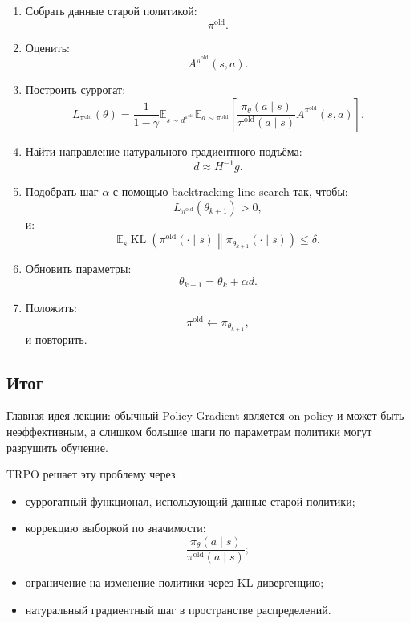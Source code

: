 \documentclass[12pt,a4paper]{article}
\begin{document}
\begin{enumerate}
    \item Собрать данные старой политикой:
    \[
    \pi^{\mathrm{old}}.
    \]

    \item Оценить:
    \[
    A^{\pi^{\mathrm{old}}}(s,a).
    \]

    \item Построить суррогат:
    \[
    L_{\pi^{\mathrm{old}}}(\theta)
    =
    \frac{1}{1-\gamma}
    \mathbb E_{s\sim d^{\pi^{\mathrm{old}}}}
    \mathbb E_{a\sim\pi^{\mathrm{old}}}
    \left[
    \frac{
    \pi_\theta(a\mid s)
    }{
    \pi^{\mathrm{old}}(a\mid s)
    }
    A^{\pi^{\mathrm{old}}}(s,a)
    \right].
    \]

    \item Найти направление натурального градиентного подъёма:
    \[
    d
    \approx
    H^{-1}g.
    \]

    \item Подобрать шаг $\alpha$ с помощью backtracking line search так, чтобы:
    \[
    L_{\pi^{\mathrm{old}}}(\theta_{k+1})>0,
    \]
    и:
    \[
    \mathbb E_s
    \operatorname{KL}
    \left(
    \pi^{\mathrm{old}}(\cdot\mid s)
    \middle\|
    \pi_{\theta_{k+1}}(\cdot\mid s)
    \right)
    \le
    \delta.
    \]

    \item Обновить параметры:
    \[
    \theta_{k+1}
    =
    \theta_k
    +
    \alpha d.
    \]

    \item Положить:
    \[
    \pi^{\mathrm{old}}
    \leftarrow
    \pi_{\theta_{k+1}},
    \]
    и повторить.
\end{enumerate}

\subsection{Итог}

Главная идея лекции: обычный Policy Gradient является on-policy и может быть неэффективным, а слишком большие шаги по параметрам политики могут разрушить обучение.

TRPO решает эту проблему через:
\begin{itemize}
    \item суррогатный функционал, использующий данные старой политики;
    \item коррекцию выборкой по значимости:
    \[
    \frac{\pi_\theta(a\mid s)}
    {\pi^{\mathrm{old}}(a\mid s)};
    \]
    \item ограничение на изменение политики через KL-дивергенцию;
    \item натуральный градиентный шаг в пространстве распределений.
\end{itemize}
\end{document}
